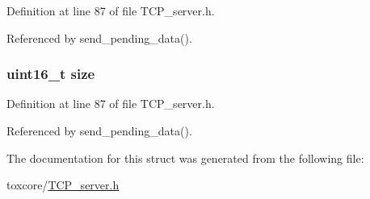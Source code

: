 Definition at line 87 of file T\+C\+P\+\_\+server.\+h.



Referenced by send\+\_\+pending\+\_\+data().

\hypertarget{struct_t_c_p___priority___list_aaba88b24a21a6c70c895c0d55f4a69a0}{
\subsubsection[{size}]{\setlength{\rightskip}{0pt plus 5cm}uint16\+\_\+t size}}\label{struct_t_c_p___priority___list_aaba88b24a21a6c70c895c0d55f4a69a0}


Definition at line 87 of file T\+C\+P\+\_\+server.\+h.



Referenced by send\+\_\+pending\+\_\+data().



The documentation for this struct was generated from the following file\+:\begin{DoxyCompactItemize}
\item 
toxcore/\hyperlink{_t_c_p__server_8h}{T\+C\+P\+\_\+server.\+h}\end{DoxyCompactItemize}
